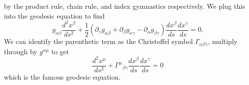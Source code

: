 by the product rule, chain rule, and index gymnastics
respectively. We plug this into the geodesic equation to find
\begin{equation}
g_{\alpha\beta}\frac{d^{2}x^{\beta}}{ds^{2}} +
\frac{1}{2}(\partial_{\gamma}g_{\alpha\beta}+\partial_{\beta}g_{\alpha\gamma}-\partial_{\alpha}g_{\beta\gamma})\frac{dx^{\beta}}{ds}\frac{dx^{\gamma}}{ds}=0.
\end{equation}
We can identify the parenthetic term as the Christoffel symbol
$\Gamma_{\alpha\beta\gamma}$, multiply through by $g^{\alpha\mu}$
to get
\begin{equation}
\boxed{ \frac{d^{2}x^{\mu}}{ds^{2}} +
  {\Gamma^{\mu}}_{\beta\gamma}\frac{dx^{\beta}}{ds}\frac{dx^{\gamma}}{ds}=0}
\end{equation}
which is the famous geodesic equation.
